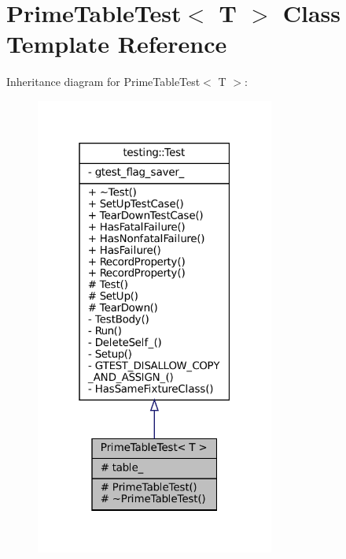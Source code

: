 \hypertarget{classPrimeTableTest}{}\section{Prime\+Table\+Test$<$ T $>$ Class Template Reference}
\label{classPrimeTableTest}


Inheritance diagram for Prime\+Table\+Test$<$ T $>$\+:
\nopagebreak
\begin{figure}[H]
\begin{center}
\leavevmode
\includegraphics[width=223pt]{classPrimeTableTest__inherit__graph}
\end{center}
\end{figure}


